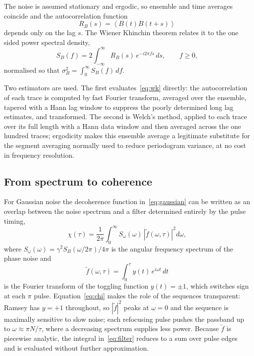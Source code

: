 \documentclass[conference]{IEEEtran}
\newcommand{\avg}[1]{\left\langle#1\right\rangle}
\begin{document}
The noise is assumed stationary and ergodic, so ensemble and time averages
coincide and the autocorrelation function
\begin{equation}
R_B(s) = \avg{B(t)B(t+s)}
\end{equation}
depends only on the lag $s$. The Wiener Khinchin theorem relates it to the
one sided power spectral density,
\begin{equation}
S_B(f) = 2\int_{-\infty}^{\infty} R_B(s)\,e^{-i2\pi f s}\,ds , \qquad f \ge 0 ,
\label{eq:wk}
\end{equation}
normalised so that $\sigma_B^2 = \int_0^\infty S_B(f)\,df$.

Two estimators are used. The first evaluates~\eqref{eq:wk} directly: the
autocorrelation of each trace is computed by fast Fourier transform, averaged over
the ensemble, tapered with a Hann lag window to suppress the poorly determined
long lag estimates, and transformed. The second is Welch's method, applied to each
trace over its full length with a Hann data window and then averaged across the
one hundred traces; ergodicity makes this ensemble average a legitimate substitute
for the segment averaging normally used to reduce periodogram variance, at no cost
in frequency resolution.

\subsection{From spectrum to coherence}

For Gaussian noise the decoherence function in~\eqref{eq:gaussian} can be written
as an overlap between the noise spectrum and a filter determined entirely by the
pulse timing,
\begin{equation}
\chi(\tau) = \frac{1}{2\pi}\int_0^\infty
S_\omega(\omega)\,\left|\tilde{f}(\omega,\tau)\right|^2 d\omega ,
\label{eq:chi}
\end{equation}
where $S_\omega(\omega) = \gamma^2 S_B(\omega/2\pi)/4\pi$ is the angular frequency
spectrum of the phase noise and
\begin{equation}
\tilde{f}(\omega,\tau) = \int_0^{\tau} y(t)\,e^{i\omega t}\,dt
\label{eq:filter}
\end{equation}
is the Fourier transform of the toggling function $y(t)=\pm 1$, which switches
sign at each $\pi$ pulse. Equation~\eqref{eq:chi} makes the role of the sequences
transparent: Ramsey has $y=+1$ throughout, so $|\tilde{f}|^2$ peaks at
$\omega=0$ and the sequence is maximally sensitive to slow noise; each refocusing
pulse pushes the passband up to $\omega \approx \pi N/\tau$, where a decreasing
spectrum supplies less power. Because $\tilde{f}$ is piecewise analytic, the
integral in~\eqref{eq:filter} reduces to a sum over pulse edges and is evaluated
without further approximation.
\end{document}
